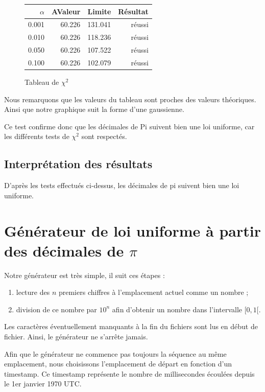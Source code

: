 \documentclass[10pt,a4paper]{article}
\begin{document}
\newpage



\begin{figure}[h]
\centering
\begin{tabular}{|r|r|r|r|}
\hline
$\alpha$ & AValeur & Limite & Résultat\\
\hline
0.001 & 60.226 & 131.041 & réussi\\
0.010 & 60.226 & 118.236 & réussi\\
0.050 & 60.226 & 107.522 & réussi\\
0.100 & 60.226 & 102.079 & réussi\\
\hline
\end{tabular}
\caption{Tableau de $\chi^2$}
\end{figure}


Nous remarquons que les valeurs du tableau sont proches des valeurs théoriques. Ainsi que notre graphique suit la forme d'une gaussienne. 

Ce test confirme donc que les décimales de Pi suivent bien une loi uniforme, car les différents tests de $\chi^2$ sont respectés.


\subsection{Interprétation des résultats}
D'après les tests effectués ci-dessus, les décimales de pi suivent bien une loi uniforme.
	
	\newpage
	\section{Générateur de loi uniforme à partir des décimales de $\pi$}
	Notre générateur est très simple, il suit ces étapes :
	\begin{enumerate}
		\item lecture des $n$ premiers chiffres à l'emplacement actuel comme un nombre ;
		\item division de ce nombre par $10^{n}$ afin d'obtenir un nombre dans l'intervalle $[0, 1[$.
	\end{enumerate}
	Les caractères éventuellement manquants à la fin du fichiers sont lus en début de fichier. Ainsi, le générateur ne s'arrête jamais.
	
	Afin que le générateur ne commence pas toujours la séquence au même emplacement, nous choisissons l'emplacement de départ en fonction d'un timestamp.
	Ce timestamp représente le nombre de millisecondes écoulées depuis le 1er janvier 1970 UTC.
	
\end{document}

